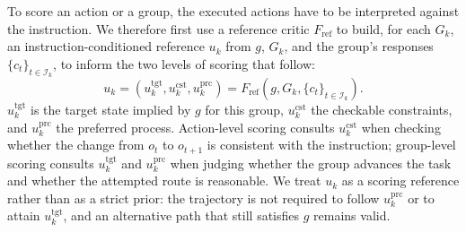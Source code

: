 To score an action or a group, the executed actions have to be interpreted against the instruction. We therefore first use a reference critic $F_{\mathrm{ref}}$ to build, for each $G_k$, an instruction-conditioned reference $u_k$ from $g$, $G_k$, and the group's responses $\{c_t\}_{t\in\mathcal{I}_k}$, to inform the two levels of scoring that follow:
\begin{equation}
    u_k
    = (u_k^{\mathrm{tgt}}, u_k^{\mathrm{cst}}, u_k^{\mathrm{prc}})
    = F_{\mathrm{ref}}(g, G_k, \{c_t\}_{t\in\mathcal{I}_k}).
\end{equation}
$u_k^{\mathrm{tgt}}$ is the target state implied by $g$ for this group, $u_k^{\mathrm{cst}}$ the checkable constraints, and $u_k^{\mathrm{prc}}$ the preferred process. Action-level scoring consults $u_k^{\mathrm{cst}}$ when checking whether the change from $o_t$ to $o_{t+1}$ is consistent with the instruction; group-level scoring consults $u_k^{\mathrm{tgt}}$ and $u_k^{\mathrm{prc}}$ when judging whether the group advances the task and whether the attempted route is reasonable. We treat $u_k$ as a scoring reference rather than as a strict prior: the trajectory is not required to follow $u_k^{\mathrm{prc}}$ or to attain $u_k^{\mathrm{tgt}}$, and an alternative path that still satisfies $g$ remains valid.

